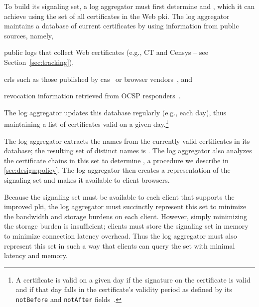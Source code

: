 To build its signaling set, a log aggregator must first determine \httpsset
and \multicertset, which it can achieve using the set of all certificates in the
Web \ac{pki}. The log aggregator maintains a database of current certificates by
using information from public sources, namely,
\begin{inparaenum}
\item public logs that collect Web certificates 
  (e.g., CT and Censys -- see Section~\ref{sec:tracking}),
\item \acp{crl} such as those published by \acp{ca}~\cite{rfc5280} or browser
  vendors~\cite{langley2012revocation, goodwin2015revoking}, and
\item revocation information retrieved from OCSP responders~\cite{rfc6960}.
\end{inparaenum}
The log aggregator updates this database regularly (e.g., each day), thus
maintaining a list of certificates valid on a given day.\footnote{A certificate
  is valid on a given day if the signature on the certificate is valid and if
  that day falls in the certificate's validity period as defined by its
\texttt{notBefore} and \texttt{notAfter} fields~\cite{rfc5280}.}

The log aggregator extracts the names from the currently valid
certificates in its database;
the resulting set of distinct names is \httpsset. 
The log aggregator also analyzes the certificate chains
in this set to determine \multicertset, a procedure we describe in
\autoref{sec:design:policy}. The log aggregator then creates a representation of
the signaling set and makes it available to client browsers.

Because the signaling set must be available to each client that supports the
improved \ac{pki},
the log aggregator must succinctly represent this set to minimize the bandwidth and storage burdens on
each client. However, simply minimizing the storage burden is insufficient;
clients must store the signaling set in memory to minimize connection latency
overhead. Thus the log aggregator must also represent this set in such a way
that clients can query the set with minimal latency and memory.

